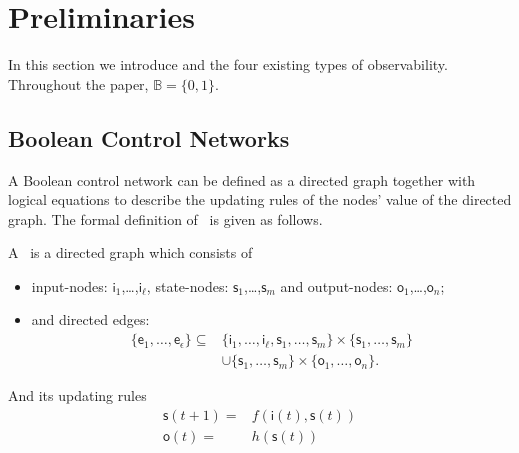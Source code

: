 
\section{Preliminaries} 
\label{sec:pre}
In this section we introduce {\BCNs} and the four existing types of observability. Throughout the paper,  $\mathbb{B}=\{0,1\}$.

\subsection{Boolean Control Networks}

A Boolean control network can be defined as a directed graph together with logical equations to describe the updating rules of the nodes' value of the directed graph. The formal definition of \BCN\ is given as follows. 

\begin{definition} A \BCN\
	is a directed graph which consists of 
	\begin{itemize}
	\item input-nodes: {$\mathsf{i}_1$,\ldots ,$\mathsf{i}_{\ell}$}, state-nodes: {$\mathsf{s}_1$,\ldots ,$\mathsf{s}_m$} and output-nodes: {$\mathsf{o}_1$,\ldots ,$\mathsf{o}_n$};
	\item and directed edges: 
		\begin{equation*}
			\begin{split}
				\{\mathsf{e}_1,\ldots,\mathsf{e}_{\epsilon}\}\subseteq & \{\mathsf{i}_1,\ldots ,\mathsf{i}_{\ell},\mathsf{s}_1,\ldots ,\mathsf{s}_m\}\times \{\mathsf{s}_1,\ldots ,\mathsf{s}_m\} \\
				&\cup \{\mathsf{s}_1,\ldots ,\mathsf{s}_m\}\times\{\mathsf{o}_1,\ldots ,\mathsf{o}_n\}. 
			\end{split}
		\end{equation*}
	
\end{itemize}	
And its updating rules
\begin{equation}
\begin{split}
\mathsf{s}(t+1)=&f(\mathsf{i}(t),\mathsf{s}(t))\\
\mathsf{o}(t)=&h(\mathsf{s}(t))
\end{split}
\label{equ:1}
\end{equation}
 \end{definition}

